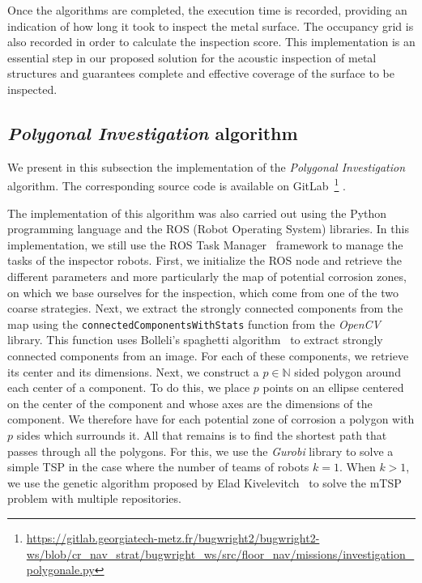 \documentclass[english,RandD]{rapportPFE}  %
\begin{document}
			Once the algorithms are completed, the execution time is recorded, providing an indication of how long it took to inspect the metal surface.
			The occupancy grid is also recorded in order to calculate the inspection score.
			This implementation is an essential step in our proposed solution for the acoustic inspection of metal structures and guarantees complete and effective coverage of the surface to be inspected.
		\subsection*{\textit{Polygonal Investigation} algorithm}
			We present in this subsection the implementation of the \textit{Polygonal Investigation} algorithm.
			The corresponding source code is available on GitLab~\footnote{\url{https://gitlab.georgiatech-metz.fr/bugwright2/bugwright2-ws/blob/cr_nav_strat/bugwright_ws/src/floor_nav/missions/investigation_polygonale.py}} .

			The implementation of this algorithm was also carried out using the Python programming language and the ROS (Robot Operating System) libraries.
			In this implementation, we still use the ROS Task Manager~\cite{ROSTaskManager} framework to manage the tasks of the inspector robots.
			First, we initialize the ROS node and retrieve the different parameters and more particularly the map of potential corrosion zones, on which we base ourselves for the inspection, which come from one of the two coarse strategies.
			Next, we extract the strongly connected components from the map using the \texttt{connectedComponentsWithStats} function from the \textit{OpenCV} library.
			This function uses Bolleli's spaghetti algorithm~\cite{BolelliSpaghetti} to extract strongly connected components from an image.
			For each of these components, we retrieve its center and its dimensions.
			Next, we construct a $p \in \mathbb{N}$ sided polygon around each center of a component.
			To do this, we place $p$ points on an ellipse centered on the center of the component and whose axes are the dimensions of the component.
			We therefore have for each potential zone of corrosion a polygon with $p$ sides which surrounds it.
			All that remains is to find the shortest path that passes through all the polygons.
			For this, we use the \textit{Gurobi} library to solve a simple TSP in the case where the number of teams of robots $k = 1$.
			When $k > 1$, we use the genetic algorithm proposed by Elad Kivelevitch~\cite{MDMTSPV_GA} to solve the mTSP problem with multiple repositories.
\end{document}

